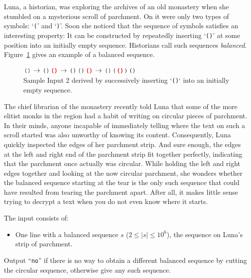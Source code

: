 
\newcommand{\bracketprotagonist}{Luna}
%
\bracketprotagonist{}, a historian, was exploring the archives of an
old monastery when she stumbled on a mysterious scroll of parchment.
On it were only two types of symbols: `\texttt{(}' and `\texttt{)}'.
Soon she noticed that the sequence of symbols satisfies an interesting property:
It can be constructed by repeatedly inserting `\texttt{()}' at some
position into an initially empty sequence.
Historians call such sequences \emph{balanced}.
Figure~\ref{fig:bracket} gives an
example of a balanced sequence.

\begin{figure}[!h]
\centering
\includegraphics[width=0.55\textwidth]{bracket}
	\caption{Sample Input 2 derived by successively inserting
	`\texttt{()}` into an initially empty sequence.}
\label{fig:bracket}
\end{figure}

The chief librarian of the monastery recently told \bracketprotagonist{}
that some of the more elitist monks in the region had a habit of writing
on circular pieces of parchment.
In their minds, anyone
incapable of immediately telling where the text on such a scroll started was
also unworthy of knowing its content.
Consequently, \bracketprotagonist{} quickly inspected the edges of her
parchment strip. And sure enough, the edges at the left and right
end of the parchment strip fit together perfectly, indicating that the parchment
once actually was circular.
While holding the left and right edges together and looking at the now circular
parchment, she wonders whether the balanced sequence starting at the tear is the only
such sequence that could have resulted from tearing the parchment apart.
After all, it makes little sense trying to decrypt a text when you do not even
know where it starts.

\begin{Input}
	The input consists of:
	\begin{itemize}
		\item One line with a balanced sequence $s$ ($2\leq |s|\leq
			10^6$),
			the sequence on \bracketprotagonist{}'s strip of parchment.
	\end{itemize}
\end{Input}

\begin{Output}
	Output ``\texttt{no}'' if there is no way to obtain a different balanced
	sequence by cutting the circular sequence,
	otherwise give any such sequence.
\end{Output}
